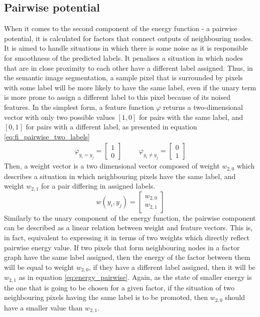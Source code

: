 \subsection{Pairwise potential}

When it comes to the second component of the energy function - a pairwise potential, it is calculated for factors that connect outputs of neighbouring nodes. It is aimed to handle situations in which there is some noise as it is responsible for smoothness of the predicted labels. It penalises a situation in which nodes that are in close proximity to each other have a different label assigned. Thus, in the semantic image segmentation, a sample pixel that is surrounded by pixels with some label will be more likely to have the same label, even if the unary term is more prone to assign a different label to this pixel because of its noised features. In the simplest form, a feature function $\varphi$ returns a two-dimensional vector with only two possible values $[1,0]$ for pairs with the same label, and $[0,1]$ for pairs with a different label, as presented in equation \ref{eq:fi_pairwise_two_labels}
\begin{equation}
    \label{eq:fi_pairwise_two_labels}
    \begin{matrix}
        \varphi_{y_i = y_j} = \begin{bmatrix}
            1 \\
            0
        \end{bmatrix} & & &
        \varphi_{y_i \neq y_j} = \begin{bmatrix}
            0 \\
            1
        \end{bmatrix}
    \end{matrix}
\end{equation}
Then, a weight vector is a two dimensional vector composed of weight $w_{2,0}$ which describes a situation in which neighbouring pixels have the same label, and weight $w_{2,1}$ for a pair differing in assigned labels. 
\begin{equation}
    \label{eq:weight_pairwise}
    w(y_i, y_j) = \begin{bmatrix}
        w_{2,0} \\ 
        w_{2,1}
    \end{bmatrix}
\end{equation}
Similarly to the unary component of the energy function, the pairwise component can be described as a linear relation between weight and feature vectors. This is, in fact,  equivalent to expressing it in terms of two weights which directly reflect pairwise energy value. If two pixels that form neighbouring nodes in a factor graph have the same label assigned, then the energy of the factor between them will be equal to weight $w_{2,0}$, if they have a different label assigned, then it will be $w_{2,1}$ as in equation \ref{eq:energy_pairwise}. Again, as the state of smaller energy is the one that is going to be chosen for a given factor, if the situation of two neighbouring pixels having the same label is to be promoted, then $w_{2,0}$ should have a smaller value than $w_{2,1}$.
